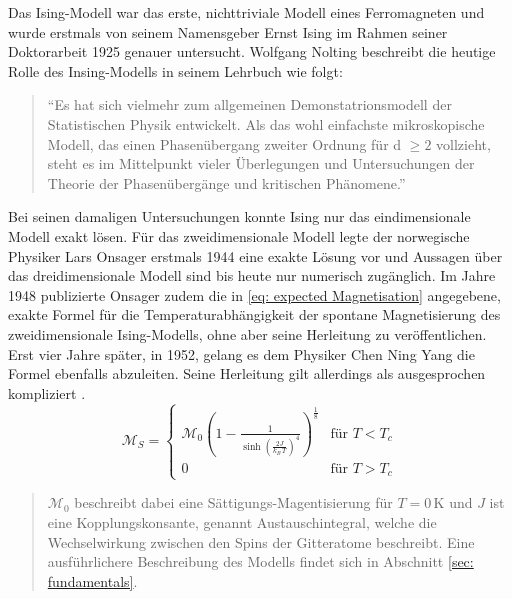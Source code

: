 Das Ising-Modell war das erste, nichttriviale Modell eines Ferromagneten und wurde erstmals von seinem Namensgeber Ernst Ising im Rahmen seiner Doktorarbeit 1925 genauer untersucht. Wolfgang Nolting beschreibt die heutige Rolle des Insing-Modells in seinem Lehrbuch wie folgt:
\begin{quote}
``Es hat sich vielmehr zum allgemeinen Demonstatrionsmodell der Statistischen Physik entwickelt. Als das wohl einfachste mikroskopische Modell, das einen Phasenübergang zweiter Ordnung für d $\geq2$ vollzieht, steht es im Mittelpunkt vieler Überlegungen und Untersuchungen der Theorie der Phasenübergänge und kritischen Phänomene.'' \cite{StatPhys_Nolting_K4}
\end{quote}
Bei seinen damaligen Untersuchungen konnte Ising nur das eindimensionale Modell exakt lösen. Für das zweidimensionale Modell legte der norwegische Physiker Lars Onsager erstmals 1944 eine exakte Lösung vor und Aussagen über das dreidimensionale Modell sind bis heute nur numerisch zugänglich.
Im Jahre 1948 publizierte Onsager zudem die in \eqref{eq: expected Magnetisation} angegebene, exakte Formel für die Temperaturabhängigkeit der spontane Magnetisierung des zweidimensionale Ising-Modells, ohne aber seine Herleitung zu veröffentlichen. Erst vier Jahre später, in 1952, gelang es dem Physiker Chen Ning Yang die Formel ebenfalls abzuleiten. Seine Herleitung gilt allerdings als ausgesprochen kompliziert \cite{Montroll_Potts_Ward}.\\
\begin{equation} \label{eq: expected Magnetisation}
\mathcal{M}_S = \left\{ \begin{array}{cr} \mathcal{M}_0\left(1-\frac{1}{\sinh(\frac{2J}{k_B\,T})^4}\right)^{\frac{1}{8}} & \text{für } T < T_c \\ 0 &\text{für } T > T_c   \end{array} \right.
\end{equation}
\begin{quote}
\small
$\mathcal{M}_0$ beschreibt dabei eine Sättigungs-Magentisierung für $T = 0\,\mathrm{K}$ und $J$ ist eine Kopplungskonsante, genannt Austauschintegral, welche die Wechselwirkung zwischen den Spins der Gitteratome beschreibt. Eine ausführlichere Beschreibung des Modells findet sich in Abschnitt \ref{sec: fundamentals}. 
\end{quote}

